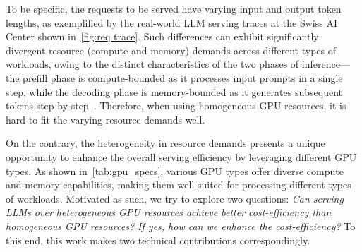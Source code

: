 To be specific, the requests to be served have varying input and output token lengths, as exemplified by the real-world LLM serving traces at the Swiss AI Center shown in~\autoref{fig:req trace}. 
Such differences can exhibit significantly divergent resource (compute and memory) demands across different types of workloads, owing to the distinct characteristics of the two phases of inference--- the prefill phase is compute-bounded as it processes input prompts in a single step, while the decoding phase is memory-bounded as it generates subsequent tokens step by step~\cite{zhong2024distserve,patel2024splitwise}. 
Therefore, when using homogeneous GPU resources, it is hard to fit the varying resource demands well. 





On the contrary, the heterogeneity in resource demands presents a unique opportunity to enhance the overall serving efficiency by leveraging different GPU types. As shown in~\autoref{tab:gpu_specs}, various GPU types offer diverse compute and memory capabilities, making them well-suited for processing different types of workloads. 
Motivated as such, we try to explore two questions: \textit{Can serving LLMs over heterogeneous GPU resources achieve better cost-efficiency than homogeneous GPU resources? If yes, how can we enhance the cost-efficiency?}
To this end, this work makes two technical contributions correspondingly.


